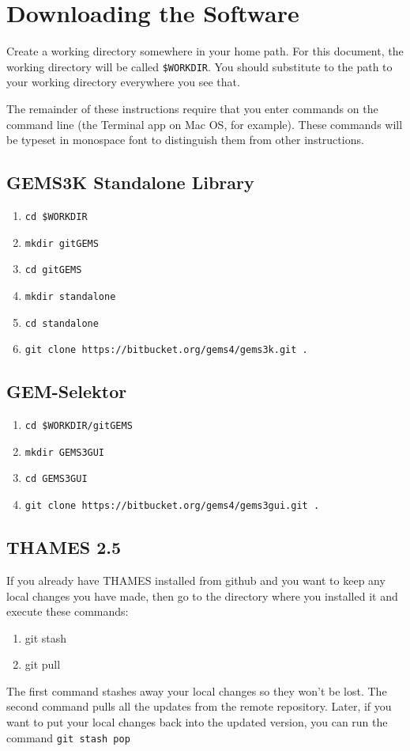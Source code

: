\documentclass{article}
\begin{document}
\section{Downloading the Software}
Create a working directory somewhere in your home path.  For this document, the working
directory will be called \verb!$WORKDIR!.  You should substitute to the path to your working
directory everywhere you see that.

The remainder of these instructions require that you enter commands on the command line
(the Terminal app on Mac OS, for example).  These commands will be typeset in monospace
font to distinguish them from other instructions.

\subsection{GEMS3K Standalone Library}
\begin{enumerate}
        \item \verb!cd $WORKDIR!
        \item \verb!mkdir gitGEMS!
        \item \verb!cd gitGEMS!
        \item \verb!mkdir standalone!
        \item \verb!cd standalone!
        \item \verb!git clone https://bitbucket.org/gems4/gems3k.git .!
\end{enumerate}

\subsection{GEM-Selektor}
\begin{enumerate}
        \item \verb!cd $WORKDIR/gitGEMS!
        \item \verb!mkdir GEMS3GUI!
        \item \verb!cd GEMS3GUI!
        \item \verb!git clone https://bitbucket.org/gems4/gems3gui.git .!
\end{enumerate}

\subsection{THAMES 2.5}
If you already have THAMES installed from github and you want to keep any local changes you
have made, then go to the directory where
you installed it and execute these commands:
\begin{enumerate}
    \item git stash
    \item git pull
\end{enumerate}
The first command stashes away your local changes so they won't be lost.  The second
command pulls all the updates from the remote repository.  Later, if you want to
put your local changes back into the updated version, you can run the command
\verb!git stash pop!
\end{document}
